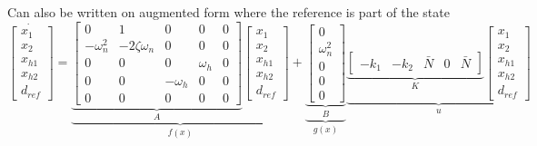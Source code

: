 Can also be written on augmented form where the reference is part of the state
\begin{equation}
\dot{\begin{bmatrix}
	x_1\\x_2\\x_{h1}\\x_{h2}\\d_{ref}
	\end{bmatrix}} = 
\underbrace{\underbrace{\begin{bmatrix}
		0 & 1 & 0 & 0 & 0\\
		-\omega_n^2  & -2\zeta \omega_n  & 0 & 0 & 0\\
		0 & 0 & 0 & \omega_h & 0\\
		0 & 0 & -\omega_h & 0 & 0\\
		0 & 0 & 0 & 0 & 0
		\end{bmatrix}}_{A}
	\begin{bmatrix}
	x_1\\x_2\\x_{h1}\\x_{h2}\\d_{ref}
	\end{bmatrix}}_{f(x)} + 
\underbrace{\underbrace{\begin{bmatrix}
		0\\\omega_n^2 \\ 0 \\ 0 \\ 0
		\end{bmatrix}}_{B}}_{g(x)}
\underbrace{\underbrace{\begin{bmatrix}
		-k_1 & -k_2 & \bar{N} & 0 & \bar{N}
		\end{bmatrix}}_{K}
	\begin{bmatrix}
	x_1\\x_2\\x_{h1}\\x_{h2}\\d_{ref}
	\end{bmatrix}}_{u}
\end{equation}
